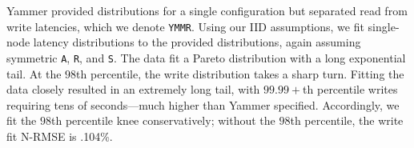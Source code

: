 \documentclass{vldb}
\begin{document}
Yammer provided distributions for a single configuration but separated
read from write latencies, which we denote \texttt{YMMR}.  Using our
IID assumptions, we fit single-node latency distributions to the
provided distributions, again assuming symmetric \texttt{A},
\texttt{R}, and \texttt{S}.  The data fit a Pareto distribution with a
long exponential tail.  At the $98$th percentile, the write
distribution takes a sharp turn.  Fitting the data closely resulted in
an extremely long tail, with $99.99+$th percentile writes requiring
tens of seconds---much higher than Yammer specified.  Accordingly, we
fit the $98$th percentile knee conservatively; without the $98$th
percentile, the write fit N-RMSE is .104\%.


\begin{figure}[t!]
\centering
{}\\[-1mm]

\end{figure}
\end{document}
